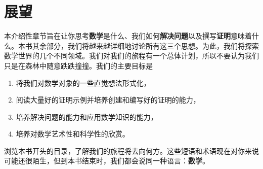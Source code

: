 \section{展望}\label{sec:section1.6}

本介绍性章节旨在让你思考\textbf{数学}是什么、我们如何\textbf{解决问题}以及撰写\textbf{证明}意味着什么。本书其余部分，我们将越来越详细地讨论所有这三个思想。为此，我们将探索数学世界的几个不同领域。我们对我们的旅程有一个总体计划，所以不要认为我们只是在森林中随意跌跌撞撞。我们的主要目标是 

\begin{enumerate}
    \item 将我们对数学对象的一些直觉想法形式化，
    \item 阅读大量好的证明示例并培养创建和编写好的证明的能力，
    \item 培养解决问题的能力和应用数学知识的能力，
    \item 培养对数学艺术性和科学性的欣赏。
\end{enumerate}

浏览本书开头的目录，了解我们的旅程将去向何方。这些短语和术语现在对你来说可能还很陌生，但到本书结束时，我们都会说同一种语言：\textbf{数学}。